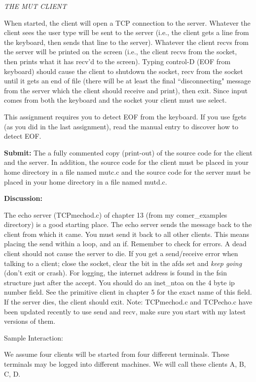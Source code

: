 {\it THE MUT CLIENT}

When started, the client will open a TCP connection to the server.
Whatever the client sees the user type will be sent to the server 
(i.e., the client gets a line from the keyboard, 
then sends that line to the server).
Whatever the client recvs from the server will be printed on the screen
(i.e., the client recvs from the socket, 
then prints what it has recv'd to the screen).
Typing control-D (EOF from keyboard) should cause the client to 
shutdown the socket, recv from the socket until it gets an end of file 
(there will be at least the final ``disconnecting" message from the
server which the client should receive and print), then exit.
Since input comes from both the keyboard and the socket your client
must use select.

This assignment requires you to detect EOF from the keyboard.
If you use {\ltt{}fgets} (as you did in the last assignment),
read the manual entry to discover how to detect EOF.

{\bf Submit:} The a fully commented copy (print-out) of the source code for the 
client and the server.
In addition,
the source code for the client must be placed in your home directory
in a file named {\ltt{}mutc.c} and
the source code for the server must be placed in your home directory
in a file named {\ltt{}mutd.c}.

{\bf Discussion:}

The echo server ({\ltt{}TCPmechod.c}) of chapter 13 
(from my {\ltt{}comer_examples} directory)
is a good starting place.
The echo server sends the message back to the client from which it came.
You must send it back to all other clients.
This means placing the {\ltt{}send} within a loop, and an {\ltt{}if}.
Remember to check for errors.
A dead client should not cause the server to die.
If you get a send/receive error when talking to a client;
close the socket, clear the bit in the {\ltt{}afds} set and
{\it keep going} (don't exit or crash).
For logging, the internet address is found in the {\ltt{}fsin} structure
just after the accept.
You should do an {\ltt{}inet_ntoa} on the 4 byte ip number field.
See the primitive client in chapter 5 for the exact name of this field.
If the server dies, the client should exit.
Note: {\ltt{}TCPmechod.c} and {\ltt{}TCPecho.c} have been updated
recently to use {\ltt{}send} and {\ltt{}recv}, make sure you start
with my latest versions of them.
\vfill

Sample Interaction:

We assume four clients will be started from four different terminals. 
These terminals may be logged into different machines.
We will call these clients A, B, C, D.

